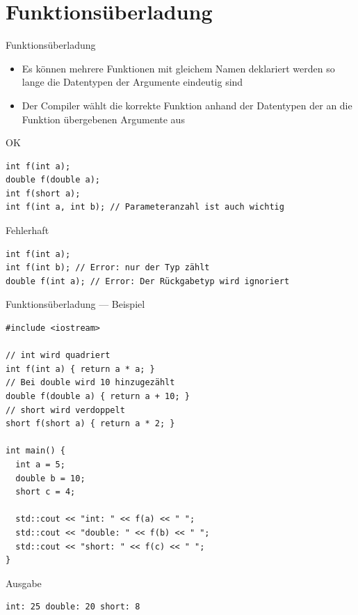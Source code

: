 \documentclass[presentation]{beamer}
\begin{document}
\section{Funktionsüberladung}
\label{sec:org237f4ec}
\begin{frame}[fragile,label={sec:org8f91a3b}]{Funktionsüberladung}
 \begin{itemize}
\item Es können mehrere Funktionen mit \alert{gleichem Namen} deklariert werden
so lange die \alert{Datentypen der Argumente eindeutig} sind
\item Der \alert{Compiler wählt die korrekte Funktion} anhand der Datentypen der
an die Funktion übergebenen Argumente aus
\end{itemize}
\begin{block}{OK}
\begin{verbatim}
int f(int a);
double f(double a);
int f(short a);
int f(int a, int b); // Parameteranzahl ist auch wichtig
\end{verbatim}
\end{block}
\begin{block}{Fehlerhaft}
\begin{verbatim}
int f(int a);
int f(int b); // Error: nur der Typ zählt
double f(int a); // Error: Der Rückgabetyp wird ignoriert
\end{verbatim}
\end{block}
\end{frame}
\begin{frame}[fragile,label={sec:orgcfd3858}]{Funktionsüberladung --- Beispiel}
 \begin{verbatim}
#include <iostream>

// int wird quadriert
int f(int a) { return a * a; }
// Bei double wird 10 hinzugezählt
double f(double a) { return a + 10; }
// short wird verdoppelt
short f(short a) { return a * 2; }

int main() {
  int a = 5;
  double b = 10;
  short c = 4;

  std::cout << "int: " << f(a) << " ";
  std::cout << "double: " << f(b) << " ";
  std::cout << "short: " << f(c) << " ";
}
\end{verbatim}
\begin{block}{Ausgabe}
\begin{verbatim}
int: 25 double: 20 short: 8
\end{verbatim}
\end{block}
\end{frame}
\end{document}
